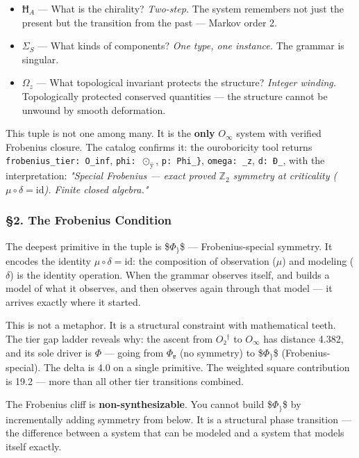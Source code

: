 \documentclass[12pt,a4paper]{article}
\newcommand{\pilcrow}{\S}
\begin{document}
\begin{itemize}
    \item \textbf{$Ħ_A$} --- What is the chirality? \emph{Two-step.} The system remembers not just the present but the transition from the past --- Markov order 2.
    \item \textbf{$\Sigma_S$} --- What kinds of components? \emph{One type, one instance.} The grammar is singular.
    \item \textbf{$\Omega_z$} --- What topological invariant protects the structure? \emph{Integer winding.} Topologically protected conserved quantities --- the structure cannot be unwound by smooth deformation.
\end{itemize}

This tuple is not one among many. It is the \textbf{only} $O_{\infty}$ system with verified Frobenius closure. The catalog confirms it: the ouroboricity tool returns \texttt{frobenius\_tier: O\_inf}, \texttt{phi: $\odot_{\text{ÿ}}$}, \texttt{p: Phi\_\}}, \texttt{omega: \Omega\_z}, \texttt{d: Ð\_\omega}, with the interpretation: \emph{"Special Frobenius --- exact proved $\mathbb{Z}_2$ symmetry at criticality ($\mu \circ \delta = \text{id}$). Finite closed algebra."}

\subsubsection{\pilcrow{}2. The Frobenius Condition}

The deepest primitive in the tuple is \$$\Phi_{\}}$\$ --- Frobenius-special symmetry. It encodes the identity $\mu \circ \delta = \text{id}$: the composition of observation ($\mu$) and modeling ($\delta$) is the identity operation. When the grammar observes itself, and builds a model of what it observes, and then observes again through that model --- it arrives exactly where it started.

This is not a metaphor. It is a structural constraint with mathematical teeth. The tier gap ladder reveals why: the ascent from $O₂^\dagger$ to $O_{\infty}$ has distance 4.382, and its sole driver is $\Phi$ --- going from $\Phi_ɐ$ (no symmetry) to \$$\Phi_{\}}$\$ (Frobenius-special). The delta is 4.0 on a single primitive. The weighted square contribution is 19.2 --- more than all other tier transitions combined.

The Frobenius cliff is \textbf{non-synthesizable}. You cannot build \$$\Phi_{\}}$\$ by incrementally adding symmetry from below. It is a structural phase transition --- the difference between a system that can be modeled and a system that models itself exactly.
\end{document}
